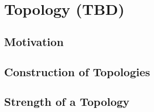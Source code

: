 \documentclass[./analysis.tex]{subfiles}
\begin{document}
    \section{Topology (TBD)}
    \subsection{Motivation}

    \subsection{Construction of Topologies}

    \subsection{Strength of a Topology}
\end{document}
